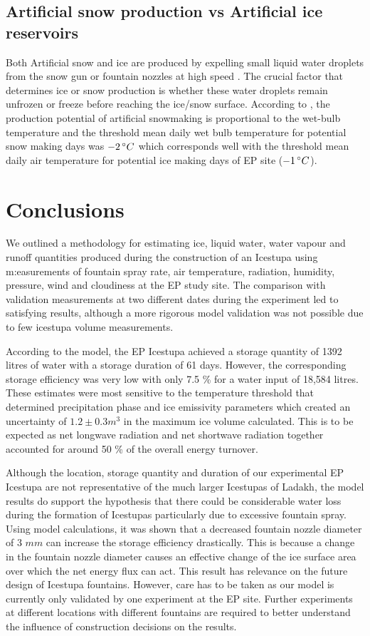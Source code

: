 \documentclass[utf8]{frontiersSCNS} %
\begin{document}
\subsection{Artificial snow production vs Artificial ice reservoirs}
Both Artificial snow and ice are produced by expelling small liquid water droplets from the snow gun or fountain
nozzles at high speed \citep{BoundaryConditionsforArtificialSnowProductionintheAustrianAlps}. The crucial factor that
determines ice or snow production is whether these water droplets remain unfrozen or freeze before reaching the
ice/snow surface. According to \citep{HARTL2018123}, the production potential of artificial snowmaking is proportional
to the wet-bulb temperature and the threshold mean daily wet bulb temperature for potential snow making days was $- 2
\, \degree C$ which corresponds well with the threshold mean daily air temperature for potential ice making days of EP
site ($- 1 \, \degree C$).

\section{Conclusions} We outlined a methodology for estimating ice, liquid water, water vapour and runoff
quantities produced during the construction of an Icestupa using m:easurements of fountain spray rate, air temperature,
radiation, humidity, pressure, wind and cloudiness at the EP study site. The comparison with validation
measurements at two different dates during the experiment led to satisfying results, although a more rigorous model
validation was not possible due to few icestupa volume measurements.

According to the model, the EP Icestupa achieved a storage quantity of 1392 litres of water with a storage
duration of 61 days. However, the corresponding storage efficiency was very low with only 7.5 \% for a water input of
18,584 litres. These estimates were most sensitive to the temperature threshold that determined precipitation phase
and ice emissivity parameters which created an uncertainty of $1.2 \pm 0.3 m^3$ in the maximum ice volume calculated.
This is to be expected as net longwave radiation and net shortwave radiation together accounted for around 50 \% of
the overall energy turnover.

Although the location, storage quantity and duration of our experimental EP Icestupa are not representative of
the much larger Icestupas of Ladakh, the model results do support the hypothesis that there could be considerable
water loss during the formation of Icestupas particularly due to excessive fountain spray. Using model calculations,
it was shown that a decreased fountain nozzle diameter of 3 $mm$ can increase the storage efficiency drastically. This
is because a change in the fountain nozzle diameter causes an effective change of the ice surface area over which the
net energy flux can act. This result has relevance on the future design of Icestupa fountains. However, care has to be
taken as our model is currently only validated by one experiment at the EP site. Further experiments at
different locations with different fountains are required to better understand the influence of construction decisions
on the results. 
\end{document}
